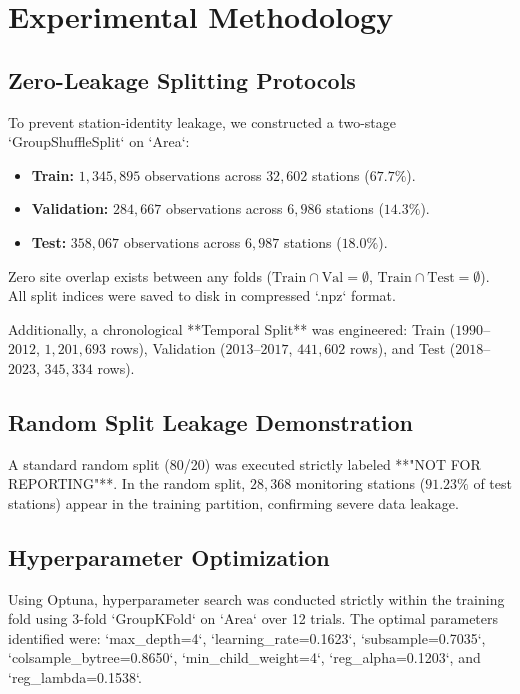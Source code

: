\documentclass[journal,10pt,twocolumn]{IEEEtran}
\begin{document}
\section{Experimental Methodology}
\subsection{Zero-Leakage Splitting Protocols}
To prevent station-identity leakage, we constructed a two-stage `GroupShuffleSplit` on `Area`:
\begin{itemize}
    \item \textbf{Train:} $1,345,895$ observations across $32,602$ stations ($67.7\%$).
    \item \textbf{Validation:} $284,667$ observations across $6,986$ stations ($14.3\%$).
    \item \textbf{Test:} $358,067$ observations across $6,987$ stations ($18.0\%$).
\end{itemize}
Zero site overlap exists between any folds ($\text{Train} \cap \text{Val} = \emptyset$, $\text{Train} \cap \text{Test} = \emptyset$). All split indices were saved to disk in compressed `.npz` format.

Additionally, a chronological **Temporal Split** was engineered: Train ($1990$--$2012$, $1,201,693$ rows), Validation ($2013$--$2017$, $441,602$ rows), and Test ($2018$--$2023$, $345,334$ rows).

\subsection{Random Split Leakage Demonstration}
A standard random split (80/20) was executed strictly labeled **"NOT FOR REPORTING"**. In the random split, $28,368$ monitoring stations ($91.23\%$ of test stations) appear in the training partition, confirming severe data leakage.

\subsection{Hyperparameter Optimization}
Using Optuna, hyperparameter search was conducted strictly within the training fold using 3-fold `GroupKFold` on `Area` over 12 trials. The optimal parameters identified were: `max_depth=4`, `learning_rate=0.1623`, `subsample=0.7035`, `colsample_bytree=0.8650`, `min_child_weight=4`, `reg_alpha=0.1203`, and `reg_lambda=0.1538`.
\end{document}

